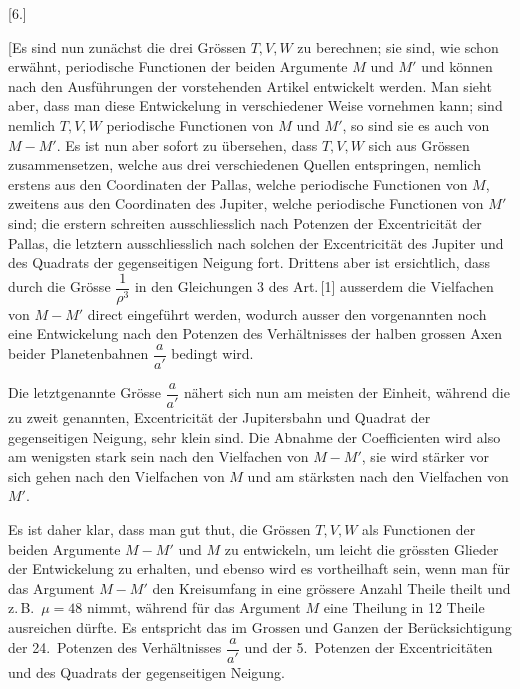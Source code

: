 \clearpage
\begin{landscape}
\begingroup
\fontsize{10}{13}\selectfont
{}
\renewcommand{\headrulewidth}{0pt}
\newcommand{\VSixPoint}{\mathord{.}\mkern5mu}
\newcommand{\VSixTenPoints}{\VSixPoint\VSixPoint\VSixPoint\VSixPoint\VSixPoint\VSixPoint\VSixPoint\VSixPoint\VSixPoint\VSixPoint}
\begin{center}[6.]\end{center}
\par\noindent\hspace*{\parindent}[Es sind nun zunächst die drei Grössen \(T,V,W\) zu berechnen; sie sind, wie schon erwähnt, periodische Functionen der beiden Argumente \(M\) und \(M'\) und können nach den Ausführungen der vorstehenden Artikel entwickelt werden. Man sieht aber, dass man diese Entwickelung in verschiedener Weise vornehmen kann; sind nemlich \(T,V,W\) periodische Functionen von \(M\) und \(M'\), so sind sie es auch von \(M-M'\). Es ist nun aber sofort zu übersehen, dass \(T,V,W\) sich aus Grössen zusammensetzen, welche aus drei verschiedenen Quellen entspringen, nemlich erstens aus den Coordinaten der Pallas, welche periodische Functionen von \(M\), zweitens aus den Coordinaten des Jupiter, welche periodische Functionen von \(M'\) sind; die erstern schreiten ausschliesslich nach Potenzen der Excentricität der Pallas, die letztern ausschliesslich nach solchen der Excentricität des Jupiter und des Quadrats der gegenseitigen Neigung fort. Drittens aber ist ersichtlich, dass durch die Grösse \(\dfrac{1}{\rho^3}\) in den Gleichungen 3 des Art.\,[1] ausserdem die Vielfachen von \(M-M'\) direct eingeführt werden, wodurch ausser den vorgenannten noch eine Entwickelung nach den Potenzen des Verhältnisses der halben grossen Axen beider Planetenbahnen \(\dfrac{a}{a'}\) bedingt wird.
\par\noindent\hspace*{\parindent}Die letztgenannte Grösse \(\dfrac{a}{a'}\) nähert sich nun am meisten der Einheit, während die zu zweit genannten, Excentricität der Jupitersbahn und Quadrat der gegenseitigen Neigung, sehr klein sind. Die Abnahme der Coefficienten wird also am wenigsten stark sein nach den Vielfachen von \(M-M'\), sie wird stärker vor sich gehen nach den Vielfachen von \(M\) und am stärksten nach den Vielfachen von \(M'\).
\par\noindent\hspace*{\parindent}Es ist daher klar, dass man gut thut, die Grössen \(T,V,W\) als Functionen der beiden Argumente \(M-M'\) und \(M\) zu entwickeln, um leicht die grössten Glieder der Entwickelung zu erhalten, und ebenso wird es vortheilhaft sein, wenn man für das Argument \(M-M'\) den Kreisumfang in eine grössere Anzahl Theile theilt und z.\,B.\ \(\mu=48\) nimmt, während für das Argument \(M\) eine Theilung in 12 Theile ausreichen dürfte. Es entspricht das im Grossen und Ganzen der Berücksichtigung der 24.\ Potenzen des Verhältnisses \(\dfrac{a}{a'}\) und der 5.\ Potenzen der Excentricitäten und des Quadrats der gegenseitigen Neigung.

\end{landscape}
